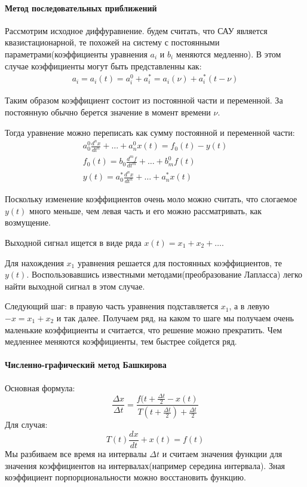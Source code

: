 \paragraph{Метод последовательных приближений}

Рассмотрим исходное диффуравнение. будем считать, что САУ является квазистационарной, те похожей на систему с постоянными параметрами(коэффициенты уравнения $a_i$ и $b_i$ меняются медленно). В этом случае коэффициенты могут быть представленны как:
\begin{align*}
	a_i=a_i(t)=a_i^0+a_i^{*} = a_i(\nu)+a_i^{*}(t-\nu)
\end{align*}

Таким образом коэффициент состоит из постоянной части и переменной. За постоянную обычно берется значение в момент времени $\nu$.

Тогда уравнение можно переписать как сумму постоянной и переменной части:
\begin{align*}
	a_0^0\frac{d^nx}{dt^n}+\ldots+a_n^0x(t)=f_0(t)-y(t) \\ 
	f_0(t) = b_0\frac{d^mf}{dt^m}+\ldots+b_m^0f(t) \\
	y(t) = a_0^{*}\frac{d^nx}{dt^n}+\ldots+a_n^{*}x(t)
\end{align*}

Поскольку изменение коэффициентов очень моло можно считать, что слогаемое $y(t)$ много меньше, чем левая часть и его можно рассматривать, как возмущение.

Выходной сигнал ищется в виде ряда $x(t)=x_1+x_2+\ldots$.

Для нахождения $x_1$ уравнения решается для постоянных коэффициентов, те $y(t)$. Воспользовавшись известными методами(преобразование Лапласса) легко найти выходной сигнал в этом случае.

Следующий шаг: в правую часть уравнения подставляется $x_1$, а в левую $-x=x_1+x_2$ и так далее. Получаем ряд, на каком то шаге мы получаем очень маленькие коэффициенты и считается, что решение можно прекратить. Чем медленнее меняются коэффициенты, тем быстрее сойдется ряд.

\paragraph{Численно-графический метод Башкирова}
Основная формула:
$$
	\frac{\Delta{}x}{\Delta{}t}=\frac{f(t+\frac{\Delta{}t}2-x(t)}{T(t+\frac{\Delta{}t}2)+\frac{\Delta{}t}2}
$$
Для случая:
$$
	T(t)\frac{dx}{dt}+x(t)=f(t)
$$
Мы разбиваем все время на интервалы $\Delta{}t$ и считаем значения функции для значения коэффициентов на интервалах(например середина интервала). Зная коэффициент порпорциональности можно восстановить функцию.

